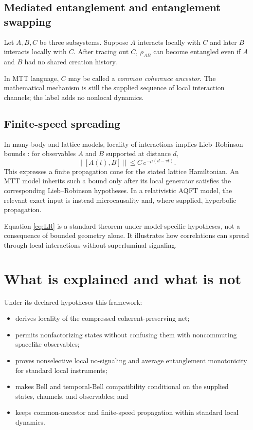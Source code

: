 \documentclass[11pt]{article}
\begin{document}
\subsection{Mediated entanglement and entanglement swapping}

Let $A,B,C$ be three subsystems. Suppose $A$ interacts locally with $C$ and later $B$ interacts locally with $C$.
After tracing out $C$, $\rho_{AB}$ can become entangled even if $A$ and $B$ had no shared creation history.

In MTT language, $C$ may be called a \emph{common coherence ancestor}.  The
mathematical mechanism is still the supplied sequence of local interaction
channels; the label adds no nonlocal dynamics.

\subsection{Finite-speed spreading}

In many-body and lattice models, locality of interactions implies Lieb--Robinson bounds \cite{LiebRobinson1972}:
for observables $A$ and $B$ supported at distance $d$,
\begin{equation}\label{eq:LR}
\|[A(t),B]\|\le C\,e^{-\mu(d-vt)}.
\end{equation}
This expresses a finite propagation cone for the stated lattice Hamiltonian.
An MTT model inherits such a bound only after its local generator satisfies
the corresponding Lieb--Robinson hypotheses.  In a relativistic AQFT model,
the relevant exact input is instead microcausality and, where supplied,
hyperbolic propagation.

\begin{remark}
Equation \eqref{eq:LR} is a standard theorem under model-specific
hypotheses, not a consequence of bounded geometry alone.  It illustrates how
correlations can spread through local interactions without superluminal
signaling.
\end{remark}

\section{What is explained and what is not}

Under its declared hypotheses this framework:
\begin{itemize}
\item derives locality of the compressed coherent-preserving net;
\item permits nonfactorizing states without confusing them with noncommuting
      spacelike observables;
\item proves nonselective local no-signaling and average entanglement
      monotonicity for standard local instruments;
\item makes Bell and temporal-Bell compatibility conditional on the supplied
      states, channels, and observables; and
\item keeps common-ancestor and finite-speed propagation within standard local
      dynamics.
\end{itemize}
\end{document}
